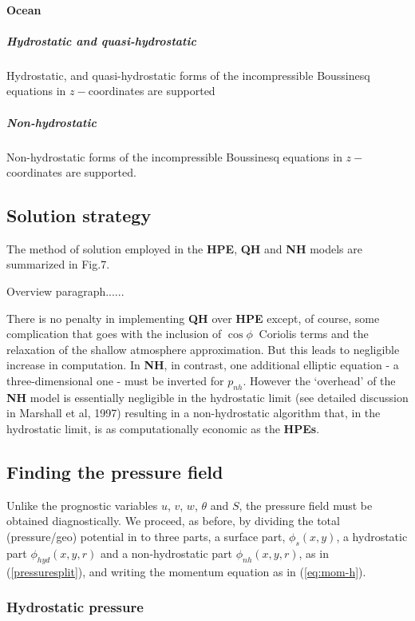 \paragraph{Ocean}

\subparagraph{Hydrostatic and quasi-hydrostatic}

Hydrostatic, and quasi-hydrostatic forms of the incompressible Boussinesq
equations in $z-$coordinates are supported

\subparagraph{Non-hydrostatic }

Non-hydrostatic forms of the incompressible Boussinesq equations in $z-$%
coordinates are supported.

\subsection{Solution strategy}

The method of solution employed in the \textbf{HPE}, \textbf{QH} and \textbf{%
NH} models are summarized in Fig.7.%

Overview paragraph......

There is no penalty in implementing \textbf{QH} over \textbf{HPE} except, of
course, some complication that goes with the inclusion of $\cos \phi \ $%
Coriolis terms and the relaxation of the shallow atmosphere approximation.
But this leads to negligible increase in computation. In \textbf{NH}, in
contrast, one additional elliptic equation - a three-dimensional one - must
be inverted for $p_{nh}$. However the `overhead' of the \textbf{NH} model is
essentially negligible in the hydrostatic limit (see detailed discussion in
Marshall et al, 1997) resulting in a non-hydrostatic algorithm that, in the
hydrostatic limit, is as computationally economic as the \textbf{HPEs}.

\subsection{Finding the pressure field}

Unlike the prognostic variables $u$, $v$, $w$, $\theta $ and $S$, the
pressure field must be obtained diagnostically. We proceed, as before, by
dividing the total (pressure/geo) potential in to three parts, a surface
part, $\phi _{s}(x,y)$, a hydrostatic part $\phi _{hyd}(x,y,r)$ and a
non-hydrostatic part $\phi _{nh}(x,y,r)$, as in (\ref{pressuresplit}), and
writing the momentum equation
as in (\ref{eq:mom-h}).

\subsubsection{Hydrostatic pressure}

